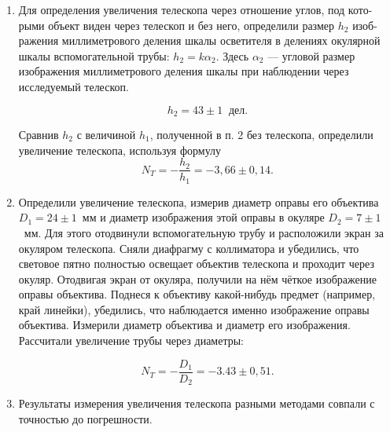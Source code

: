 \documentclass[a4paper, 12pt]{article}%
\begin{document}
\begin{enumerate}
		\item Для определения увеличения телескопа через отношение углов, под кото-
		рыми объект виден через телескоп и без него, определили размер $h_2$ изоб-
		ражения миллиметрового деления шкалы осветителя в делениях окулярной
		шкалы вспомогательной трубы: $h_2 = k\alpha_2$. Здесь $\alpha_2$ --- угловой размер изображения миллиметрового деления шкалы при наблюдении через исследуемый телескоп.
		
		\begin{equation*}
		h_2 = 43 \pm 1 \: \text{ дел}.
		\end{equation*}
		
		Сравнив $h_2$ с величиной $h_1$, полученной в п. 2 без телескопа, определили
		увеличение телескопа, используя формулу
		\begin{equation*}
		N_T = -\dfrac{h_2}{h_1} = -3,66 \pm 0,14.
		\end{equation*}
		 \item Определили увеличение телескопа, измерив диаметр оправы его объектива $D_1 = 24\pm1$~мм и диаметр изображения этой оправы в окуляре $D_2=7\pm1$~мм. Для этого отодвинули вспомогательную трубу и расположили экран за окуляром телескопа. Сняли диафрагму с коллиматора и убедились, что световое пятно полностью освещает объектив телескопа и проходит через окуляр. Отодвигая экран от окуляра, получили на нём чёткое изображение оправы объектива. Поднеся к объективу какой-нибудь предмет (например, край линейки), убедились, что наблюдается именно изображение оправы объектива. Измерили диаметр объектива и диаметр его изображения. Рассчитали увеличение трубы через диаметры:
		 
		 \begin{equation*}
		 N_T = -\dfrac{D_1}{D_2} = -3.43 \pm 0,51.
		 \end{equation*}
		 
		 \item Результаты измерения увеличения телескопа разными методами совпали с точностью до погрешности.
	\end{enumerate}
\end{document}
